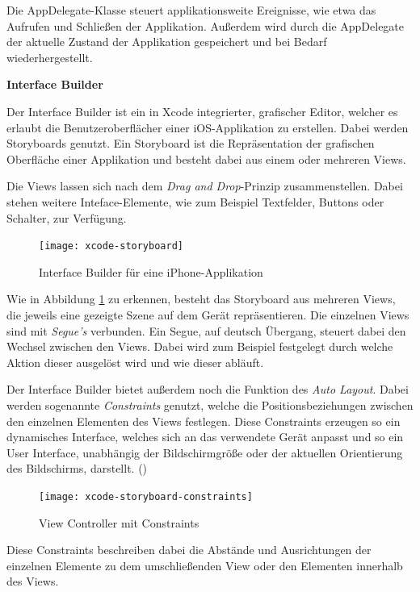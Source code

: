 Die AppDelegate-Klasse steuert applikationsweite Ereignisse, wie etwa das Aufrufen und Schließen der Applikation. Außerdem wird durch die AppDelegate der aktuelle Zustand der Applikation gespeichert und bei Bedarf wiederhergestellt.


\textbf{Interface Builder}

Der Interface Builder ist ein in Xcode integrierter, grafischer Editor, welcher es erlaubt die Benutzeroberflächer einer iOS-Applikation zu erstellen. Dabei werden Storyboards genutzt.
Ein Storyboard ist die Repräsentation der grafischen Oberfläche einer Applikation und besteht dabei aus einem oder mehreren Views.

Die Views lassen sich nach dem \emph{Drag and Drop}-Prinzip zusammenstellen. Dabei stehen weitere Inteface-Elemente, wie zum Beispiel Textfelder, Buttons oder Schalter, zur Verfügung.

\begin{figure}[htb!]
	\centering
	\texttt{[image: xcode-storyboard]}
	\caption{Interface Builder für eine iPhone-Applikation}
	\label{xcode-interface-builder}
\end{figure}

Wie in Abbildung \ref{xcode-interface-builder} zu erkennen, besteht das Storyboard aus mehreren Views, die jeweils eine gezeigte Szene auf dem Gerät repräsentieren. Die einzelnen Views sind mit \emph{Segue's} verbunden. Ein Segue, auf deutsch Übergang, steuert dabei den Wechsel zwischen den Views. Dabei wird zum Beispiel festgelegt durch welche Aktion dieser ausgelöst wird und wie dieser abläuft.


Der Interface Builder bietet außerdem noch die Funktion des \emph{Auto Layout}. Dabei werden sogenannte \emph{Constraints} genutzt, welche die Positionsbeziehungen zwischen den einzelnen Elementen des Views festlegen. Diese Constraints erzeugen so ein dynamisches Interface, welches sich an das verwendete Gerät anpasst und so ein User Interface, unabhängig der Bildschirmgröße oder der aktuellen Orientierung des Bildschirms, darstellt. (\citet{xcodeautolayout})

\begin{figure}[htb!]
		\centering
	\texttt{[image: xcode-storyboard-constraints]}
	\caption{View Controller mit Constraints}
	\label{xcode-storyboard-constraints}
\end{figure}

Diese Constraints beschreiben dabei die Abstände und Ausrichtungen der einzelnen Elemente zu dem umschließenden View oder den Elementen innerhalb des Views.

